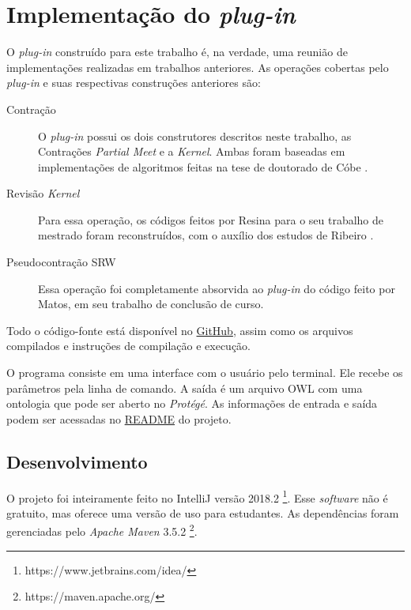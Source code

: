 \chapter{Implementação do \textit{plug-in}}
\label{chap:implementacao}

\lettrine{O}{} \textit{plug-in} construído para este trabalho é, na verdade, uma reunião de implementações realizadas em trabalhos anteriores. As operações cobertas pelo \textit{plug-in} e suas respectivas construções anteriores são:

\begin{description}
	\item[Contração] O \textit{plug-in} possui os dois construtores descritos neste trabalho, as Contrações \textit{Partial Meet} e a \textit{Kernel}. Ambas foram baseadas em implementações de algoritmos feitas na tese de doutorado de Cóbe  \citep{revisaoCobe}.
	\item[Revisão \textit{Kernel}] Para essa operação, os códigos feitos por Resina para o seu trabalho de mestrado \citep{logicaResina} foram reconstruídos, com o auxílio dos estudos de Ribeiro \citep{revisaoRibeiro2}. 
	\item[Pseudocontração SRW] Essa operação foi completamente absorvida ao \textit{plug-in} do código feito por Matos, em seu trabalho de conclusão de curso. \citep{logicaMatos}
\end{description} 

Todo o código-fonte está disponível no \href{https://github.com/lsflp/ontology-repair/}{GitHub}, assim como os arquivos
compilados e instruções de compilação e execução.

O programa consiste em uma interface com o usuário pelo terminal. Ele recebe os parâmetros pela linha de comando. A saída é um arquivo OWL com uma ontologia que pode ser aberto no \textit{Protégé}. As informações de entrada e saída podem ser acessadas no \href{https://github.com/lsflp/ontology-repair/blob/master/README.md}{README} do projeto.

\section{Desenvolvimento}

O projeto foi inteiramente feito no IntelliJ versão 2018.2 \footnote{https://www.jetbrains.com/idea/}. Esse \textit{software} não é gratuito, mas oferece uma versão de uso para estudantes. As dependências foram gerenciadas pelo \textit{Apache Maven} 3.5.2 \footnote{https://maven.apache.org/}.


